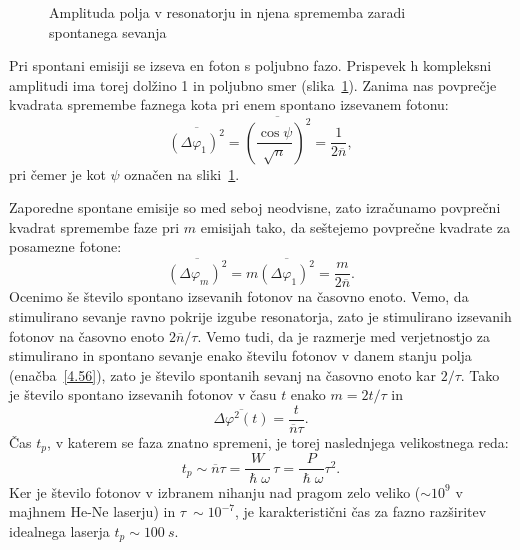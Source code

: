 \begin{figure}[ht]
\centering
\def\svgwidth{70truemm} 

\caption{Amplituda polja v resonatorju in njena sprememba zaradi 
spontanega sevanja}
\label{fig:fazor}
\end{figure}

Pri spontani emisiji se izseva en foton s poljubno fazo. Prispevek h kompleksni
amplitudi ima torej dolžino 1 in poljubno smer (slika~\ref{fig:fazor}). Zanima
nas povprečje kvadrata spremembe faznega kota pri enem spontano izsevanem fotonu:
\begin{equation}
\overline{(\Delta \varphi_{1})^{2}}=\overline{\left(\frac{\cos\psi}{\sqrt{n} }\right)^2}
=\frac{1}{2\overline{n}},
\label{5.17}
\end{equation}
pri čemer je kot $\psi$ označen na sliki~\ref{fig:fazor}. 

Zaporedne spontane emisije so med seboj neodvisne, zato izračunamo
povprečni kvadrat spremembe faze pri $m$ emisijah tako, da seštejemo
povprečne kvadrate za posamezne fotone:
\begin{equation}
\overline{(\Delta \varphi_{m})^{2}}=m\overline{(\Delta \varphi_{1})^{2}}=
\frac{m}{2\overline{n}}.
\label{5.18}
\end{equation}
Ocenimo še število spontano izsevanih fotonov na časovno enoto.
Vemo, da stimulirano sevanje ravno pokrije izgube resonatorja, zato je
stimulirano izsevanih fotonov na časovno enoto $2\overline{n}/\tau $. Vemo tudi, 
da je razmerje med verjetnostjo za stimulirano in spontano sevanje enako 
številu fotonov v danem stanju polja (enačba~\ref{4.56}), zato je število 
spontanih sevanj na časovno enoto kar $2/\tau $.
Tako je število spontano izsevanih fotonov v času $t$ enako $m=2t/\tau $ in 
\begin{equation}
\overline{\Delta \varphi^{2}(t)}=\frac{t}{\overline{n}\tau }.
\label{5.19}
\end{equation}
Čas $t_{p}$, v katerem se faza znatno spremeni, je torej naslednjega
velikostnega reda:
\begin{equation}
t_{p}\sim \overline{n}\tau =\frac{W}{\hslash \omega }\,\tau =\frac{P}{\hslash
\omega }\tau ^{2}.
\label{5.20}
\end{equation}
Ker je število fotonov v izbranem nihanju nad pragom zelo veliko ($\sim 10^9$ v majhnem 
He-Ne laserju) in $\tau~\sim 10^{-7}$, je karakteristični
čas za fazno razširitev idealnega laserja $t_p \sim 100~\si{s}$. 

